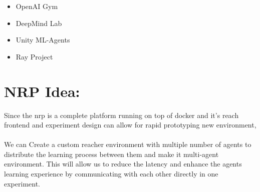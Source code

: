 \begin{itemize}
    \item OpenAI Gym
    \item DeepMind Lab
    \item Unity ML-Agents
    \item Ray Project
\end{itemize}

\section{NRP Idea:}

Since the nrp is a complete platform running on top of docker and it's reach frontend and experiment design can allow for rapid prototyping new environment,\\\\
We can Create a custom reacher environment with multiple number of agents to distribute the learning process between them and make it multi-agent environment.
This will allow us to reduce the latency and enhance the agents learning experience by communicating with each other directly in one experiment.



